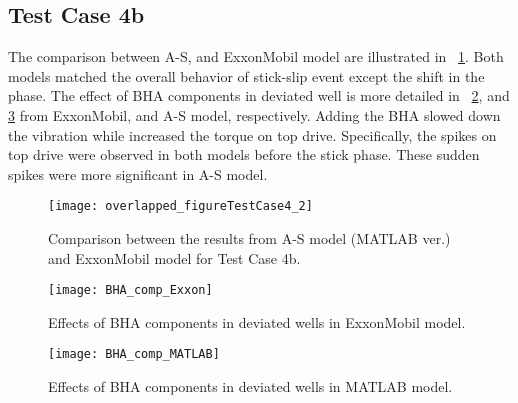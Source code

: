 \subsection{Test Case 4b}
The comparison between A-S, and ExxonMobil model are illustrated in \figurename~\ref{figure_testcase4_2_overlapped}. Both models matched the overall behavior of stick-slip event except the shift in the phase. The effect of BHA components in deviated well is more detailed in \figurename~\ref{figure_BHA_EXXON}, and \ref{figure_BHA_MATLAB} from ExxonMobil, and A-S model, respectively. Adding the BHA slowed down the vibration while increased the torque on top drive. Specifically, the spikes on top drive were observed in both models before the stick phase. These sudden spikes were more significant in A-S model.


\begin{figure}
  \centering
  \texttt{[image: overlapped\_figureTestCase4\_2]}
  \caption[Comparison of the results for Test Case 4b]{Comparison between the results from A-S model (MATLAB ver.) and ExxonMobil model for Test Case 4b.}\label{figure_testcase4_2_overlapped}
\end{figure}

\begin{figure}
  \centering
  \texttt{[image: BHA\_comp\_Exxon]}
  \caption[Effects of BHA components (ExxonMobil model)]{Effects of BHA components in deviated wells in ExxonMobil model. }\label{figure_BHA_EXXON}
\end{figure}

\begin{figure}
  \centering
  \texttt{[image: BHA\_comp\_MATLAB]}
  \caption[Effects of BHA components (MATLAB model)]{Effects of BHA components in deviated wells in MATLAB model. }\label{figure_BHA_MATLAB}
\end{figure}


